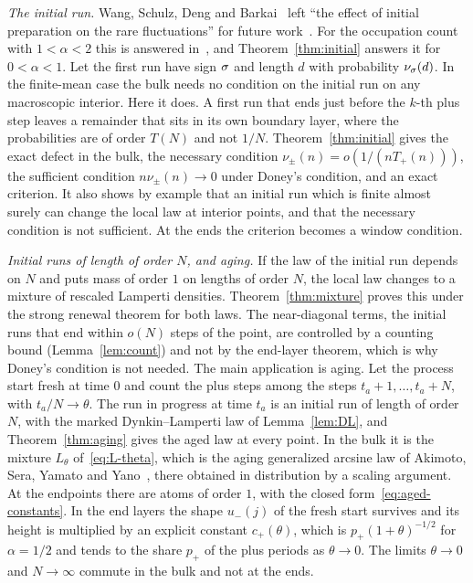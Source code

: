 \emph{The initial run.} Wang, Schulz, Deng and Barkai~\cite{wsdb2018} left ``the effect of
initial preparation on the rare fluctuations'' for future work~\cite[Section~VIII]{wsdb2018}.
For the occupation count with $1<\alpha<2$ this is answered in~\cite{paperF}, and
Theorem~\ref{thm:initial} answers it for $0<\alpha<1$. Let the first run have sign $\sigma$ and
length $d$ with probability $\nu_\sigma(d)$. In the finite-mean case the bulk needs no condition
on the initial run on any macroscopic interior. Here it does. A first run that ends just
before the $k$-th plus step leaves a remainder that sits in its own boundary layer, where the
probabilities are of order $T(N)$ and not $1/N$. Theorem~\ref{thm:initial} gives the exact
defect in the bulk, the necessary condition $\nu_\pm(n)=o(1/(nT_\plus(n)))$, the sufficient
condition $n\nu_\pm(n)\to0$ under Doney's condition, and an exact criterion. It also shows by
example that an initial run which is finite almost surely can change the local law at
interior points, and that the necessary condition is not sufficient. At the ends the
criterion becomes a window condition.

\emph{Initial runs of length of order $N$, and aging.} If the law of the initial run depends
on $N$ and puts mass of order $1$ on lengths of order $N$, the local law changes to a mixture
of rescaled Lamperti densities. Theorem~\ref{thm:mixture} proves this under the strong renewal
theorem for both laws. The near-diagonal terms, the initial runs that end within $o(N)$ steps
of the point, are controlled by a counting bound (Lemma~\ref{lem:count}) and not by the
end-layer theorem, which is why Doney's condition is not needed. The main application is
aging. Let the process start fresh at time $0$ and count the plus steps among the steps
$t_a+1,\dots,t_a+N$, with $t_a/N\to\theta$. The run in progress at time $t_a$ is an initial run
of length of order $N$, with the marked Dynkin--Lamperti law of Lemma~\ref{lem:DL}, and
Theorem~\ref{thm:aging} gives the aged law at every point. In the bulk it is the mixture
$L_\theta$ of~\eqref{eq:L-theta}, which is the aging generalized arcsine law of Akimoto, Sera,
Yamato and Yano~\cite{asyy2020}, there obtained in distribution by a scaling argument. At the
endpoints there are atoms of order $1$, with the closed form~\eqref{eq:aged-constants}. In the
end layers the shape $u_\minus(j)$ of the fresh start survives and its height is multiplied by
an explicit constant $c_\plus(\theta)$, which is $p_\plus(1+\theta)^{-1/2}$ for $\alpha=1/2$ and tends
to the share $p_\plus$ of the plus periods as $\theta\to0$. The limits $\theta\to0$ and $N\to\infty$ commute in the bulk and not at the ends.

